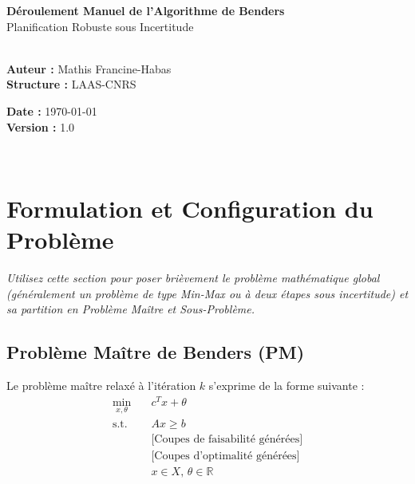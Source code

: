 \documentclass[11pt,a4paper]{article}
\begin{document}
\begin{center}
    {\color{mainblue}\LARGE\bfseries Déroulement Manuel de l'Algorithme de Benders}\\[0.3cm]
    {\color{slate}\large Planification Robuste sous Incertitude}\\[0.5cm]
    \noindent\makebox[\linewidth]{\color{bordergrey}\rule{\linewidth}{1pt}}\\[0.2cm]
    \begin{minipage}{0.48\textwidth}
        \begin{flushleft} \small
            \textbf{Auteur :} Mathis Francine-Habas \\
            \textbf{Structure :} LAAS-CNRS
        \end{flushleft}
    \end{minipage}
    \hfill
    \begin{minipage}{0.48\textwidth}
        \begin{flushright} \small
            \textbf{Date :} \today \\
            \textbf{Version :} 1.0
        \end{flushright}
    \end{minipage}\\[0.1cm]
    \noindent\makebox[\linewidth]{\color{bordergrey}\rule{\linewidth}{1pt}}
\end{center}

\vspace{0.4cm}

\section{Formulation et Configuration du Problème}
\label{sec:formulation}
\textit{Utilisez cette section pour poser brièvement le problème mathématique global (généralement un problème de type Min-Max ou à deux étapes sous incertitude) et sa partition en Problème Maître et Sous-Problème.}

\subsection{Problème Maître de Benders (PM)}
Le problème maître relaxé à l'itération $k$ s'exprime de la forme suivante :
\begin{equation}
    \begin{aligned}
        \min_{x, \theta} \quad & c^T x + \theta \\
        \text{s.t.} \quad & A x \ge b \\
        & \text{[Coupes de faisabilité générées]} \\
        & \text{[Coupes d'optimalité générées]} \\
        & x \in X, \, \theta \in \mathbb{R}
    \end{aligned}
\end{equation}
\end{document}
